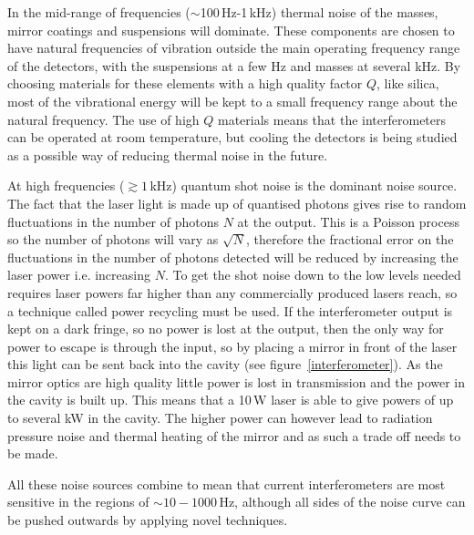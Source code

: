 In the mid-range of frequencies ($\sim$100\,Hz-1\,kHz) thermal noise of the masses, mirror coatings
and suspensions will dominate. These components are chosen to have natural frequencies of vibration
outside the main operating frequency range of the detectors, with the suspensions at a few Hz and
masses at several kHz. By choosing materials for these elements with a high quality factor $Q$, like
silica, most of the vibrational energy will be kept to a small frequency range about the natural
frequency. The use of high $Q$ materials means that the interferometers can be operated at room
temperature, but cooling the detectors is being studied as a possible way of reducing thermal noise
in the future.

At high frequencies ($\gtrsim 1$\,kHz) quantum shot noise is the dominant noise source. The fact
that the laser light is made up of quantised photons gives rise to random fluctuations in the number
of photons $N$ at the output. This is a Poisson process so the number of photons will vary as
$\sqrt{N}$, therefore the fractional error on the fluctuations in the number of photons detected
will be reduced by increasing the laser power i.e. increasing $N$. To get the shot noise down to the
low levels needed requires laser powers far higher than any commercially produced lasers reach, so a
technique called power recycling must be used. If the interferometer output is kept on a dark
fringe, so no power is lost at the output, then the only way for power to escape is through the
input, so by placing a mirror in front of the laser this light can be sent back into the cavity
(see figure~\ref{interferometer}). As the mirror optics are high quality little power is lost in
transmission and the power in the cavity is built up. This means that a 10\,W laser is able to give
powers of up to several kW in the cavity. The higher power can however lead to radiation
pressure noise and thermal heating of the mirror and as such a trade off needs to be made.

All these noise sources combine to mean that current interferometers are most sensitive in the
regions of $\sim 10 - 1000$\,Hz, although all sides of the noise curve can be pushed outwards by
applying novel techniques.

